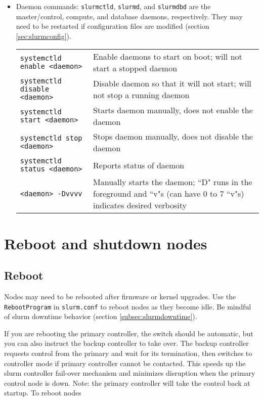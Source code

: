 \begin{itemize}
\item Daemon commands: \texttt{slurmctld}, \texttt{slurmd}, and \texttt{slurmdbd} are the master/control, compute, and database daemons, respectively. They may need to be restarted if configuration files are modified (section \ref{sec:slurmconfig}). \\
\begin{tabular}{l p{3.8in}}
\texttt{systemctld enable <daemon>} & Enable daemons to start on boot; will not start a stopped daemon \\
\texttt{systemctld disable <daemon>} & Disable daemon so that it will not start; will not stop a running daemon \\
\texttt{systemctld start <daemon>} & Starts daemon manually, does not enable the daemon \\
\texttt{systemctld stop <daemon>} & Stops daemon manually, does not disable the daemon \\
\texttt{systemctld status <daemon>} & Reports status of daemon \\
\texttt{<daemon> -Dvvvv} & Manually starts the daemon; ``D" runs in the foreground and ``v"s (can have 0 to 7 ``v"s) indicates desired verbosity \\
\end{tabular}

\end{itemize}

\section{Reboot and shutdown nodes} \label{sec:slurmpowercycle}

\subsection{Reboot} \label{subsec:slurmreboot}

Nodes may need to be rebooted after firmware or kernel upgrades. Use the \texttt{RebootProgram} in \texttt{slurm.conf} to reboot nodes as they become idle. Be mindful of slurm downtime behavior (section \ref{subsec:slurmdowntime}).

If you are rebooting the primary controller, the switch should be automatic, but you can also instruct the backup controller to take over. The backup controller requests control from the primary and wait for its termination, then switches to controller mode if primary controller cannot be contacted. This speeds up the slurm controller fail-over mechanism and minimizes disruption when the primary control node is down. Note: the primary controller will take the control back at startup. To reboot nodes

